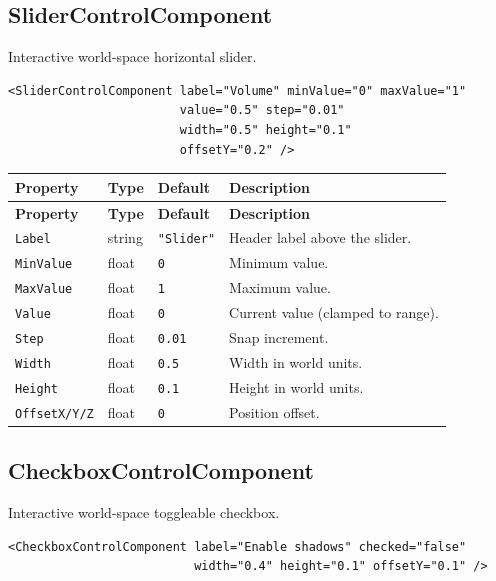 \documentclass[11pt,a4paper]{article}
\begin{document}
\subsection{SliderControlComponent}

Interactive world-space horizontal slider.

\begin{lstlisting}
<SliderControlComponent label="Volume" minValue="0" maxValue="1"
                        value="0.5" step="0.01"
                        width="0.5" height="0.1"
                        offsetY="0.2" />
\end{lstlisting}

\begin{longtable}{P{3.2cm} P{2cm} P{2.5cm} P{5.3cm}}
  \toprule
  \textbf{Property} & \textbf{Type} & \textbf{Default} & \textbf{Description} \\
  \midrule
  \endfirsthead
  \toprule
  \textbf{Property} & \textbf{Type} & \textbf{Default} & \textbf{Description} \\
  \midrule
  \endhead
  \texttt{Label} & string & \texttt{"Slider"} & Header label above the slider. \\
  \texttt{MinValue} & float & \texttt{0} & Minimum value. \\
  \texttt{MaxValue} & float & \texttt{1} & Maximum value. \\
  \texttt{Value} & float & \texttt{0} & Current value (clamped to range). \\
  \texttt{Step} & float & \texttt{0.01} & Snap increment. \\
  \texttt{Width} & float & \texttt{0.5} & Width in world units. \\
  \texttt{Height} & float & \texttt{0.1} & Height in world units. \\
  \texttt{OffsetX/Y/Z} & float & \texttt{0} & Position offset. \\
  \bottomrule
\end{longtable}

\subsection{CheckboxControlComponent}

Interactive world-space toggleable checkbox.

\begin{lstlisting}
<CheckboxControlComponent label="Enable shadows" checked="false"
                          width="0.4" height="0.1" offsetY="0.1" />
\end{lstlisting}
\end{document}
